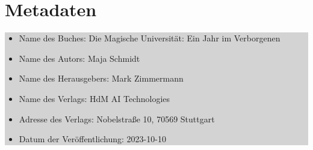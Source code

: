 \documentclass[12pt]{article}
\begin{document}
\clearpage

\section*{Metadaten}
\colorbox{lightgray}{
    \begin{minipage}{\dimexpr\textwidth-2\fboxsep}
        \vspace{1cm}
        \begin{itemize}
            \item Name des Buches: Die Magische Universität: Ein Jahr im Verborgenen
            \item Name des Autors: Maja Schmidt
            \item Name des Herausgebers: Mark Zimmermann
            \item Name des Verlags: HdM AI Technologies
            \item Adresse des Verlags: Nobelstraße 10, 70569 Stuttgart
            \item Datum der Veröffentlichung: 2023-10-10
        \end{itemize}
        \vspace{1cm}
    \end{minipage}
}
\end{document}
